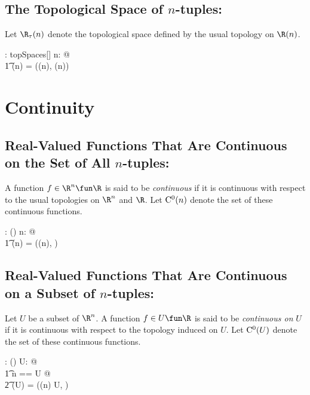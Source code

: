 \documentclass{amsart}
\begin{document}
\subsection{The Topological Space of $n$-tuples: }

Let $\tsRtup(n)$ denote the topological space defined by the usual topology on $\Rtup(n)$.

\begin{axdef}
	\tsRtup: \nat \fun topSpaces[\Rinf]
\where
	\forall n: \nat @ \\
	\t1	\tsRtup(n) = (\Rtup(n), \tauRtup(n))
\end{axdef}

\section{Continuity}

\subsection{Real-Valued Functions That Are Continuous on the Set of All $n$-tuples: }

A function $f \in \R^n \fun \R$ is said to be \textit{continuous} if it is continuous with respect to the usual topologies
on $\R^n$ and $\R$.
Let $\operatorname{C^0}(n)$ denote the set of these continuous functions.

\begin{axdef}
	\CzeroRtup: \nat \fun \power(\Rinf \pfun \R)
\where
	\forall n: \nat @ \\
	\t1	\CzeroRtup(n) = \CzeroTT(\tsRtup(n), \Rtau)
\end{axdef}

\subsection{Real-Valued Functions That Are Continuous on a Subset of $n$-tuples: }

Let $U$ be a subset of $\R^n$.
A function $f \in U \fun \R$ is said to be \textit{continuous on} $U$
if it is continuous with respect to the topology induced on $U$.
Let $\operatorname{C^0}(U)$ denote the set of these continuous functions.

\begin{axdef}
	\CzeroSubsetRtup: \DeltaRinf \fun \power(\Rinf \pfun \R)
\where
	\forall U: \DeltaRinf @ \\
	\t1	\LET n == \dimRinf U @ \\
	\t2		\CzeroSubsetRtup(U) = \CzeroTT(\tsRtup(n) \inducedTopSp U, \Rtau)
\end{axdef}
\end{document}

